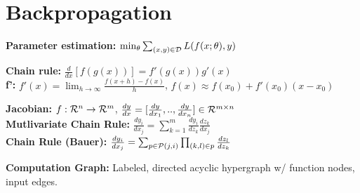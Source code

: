\section{Backpropagation}
\begin{comment}
	It is a technique that exploits the composite nature of functions by propagating the chain rule using dynamic programming.\\
\end{comment}

\textbf{Parameter estimation:} $\min_\theta \sum_{(x,y) \in \mathcal{D}} L(f(x;\theta), y)$\\
\begin{comment}
	Usually optimized by gradient descent, update $\theta$ with the gradient of the loss-function.\\
\end{comment}


\textbf{Chain rule:} $\frac{d}{dx}[f(g(x))] = f'(g(x))g'(x)$\\

\textbf{f':} $f'(x) = \lim_{h \rightarrow \infty} \frac{f(x + h) - f(x)}{h}$, $f(x) \approx f(x_0) + f'(x_0)(x - x_0)$\\
\begin{comment}
	This is simple Taylor approximation, the error term is in $\cO(x-x_0)^2$.\\
\end{comment}

\textbf{Jacobian:} $f: \mathcal{R}^n \rightarrow \mathcal{R}^m$, $\frac{dy}{dx} = [ \frac{dy}{dx_1},.., \frac{dy}{dx_n} ] \in \mathcal{R}^{m\times n}$\\

\textbf{Mutlivariate Chain Rule:} $\frac{dy_i}{dx_j} = \sum^m_{k=1} \frac{dy_i}{dz_k}\frac{dz_k}{dx_j}$\\

\textbf{Chain Rule (Bauer):} $\frac{dy_i}{dx_j} = \sum_{p \in \mathcal{P}(j,i)} \prod_{(k,l) \in p} \frac{dz_l}{dz_k}$\\
\begin{comment}
The partial derivative is the sum over all paths in a computation graph.
$\cP(j,i)$ denotes the set of Bauer paths, with a worst case size in $\cO(m^n)$ (n layers and m nodes per layer).\\
\end{comment}

\textbf{Computation Graph:} Labeled, directed acyclic hypergraph w/ function nodes, input edges. \\
\begin{comment}
Edges describe the flow of variables into the functions.
Backpropagation can leverage this, assigning each edge a local derivation between the nodes as well.
Hypergraph means that edges can have multiple sources and targets, e.g. a variable can flow into multiple functions.\\
\end{comment}

